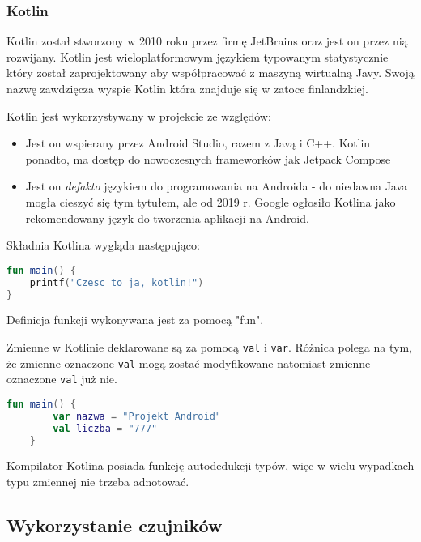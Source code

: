 \subsubsection{Kotlin}

Kotlin został stworzony w 2010 roku przez firmę JetBrains oraz jest on przez nią rozwijany. Kotlin jest wieloplatformowym językiem typowanym statystycznie który został zaprojektowany aby współpracować z maszyną wirtualną Javy. Swoją nazwę zawdzięcza wyspie Kotlin która znajduje się w zatoce finlandzkiej.

Kotlin jest wykorzystywany w projekcie ze względów:

\begin{itemize}
	\item Jest on wspierany przez Android Studio, razem z Javą i C++. Kotlin ponadto, ma dostęp do nowoczesnych frameworków jak Jetpack Compose
	
	\item Jest on \textit{defakto} językiem do programowania na Androida - do niedawna Java mogła cieszyć się tym tytułem, ale od 2019 r. Google ogłosiło Kotlina jako rekomendowany język do tworzenia aplikacji na Android.
\end{itemize}

Składnia Kotlina wygląda następująco:

\begin{lstlisting}[caption=kotlin001 - Funkcje, label={lst:listing-k}, language=kotlin]
fun main() {
	printf("Czesc to ja, kotlin!")
}
\end{lstlisting}
Definicja funkcji wykonywana jest za pomocą "fun".

Zmienne w Kotlinie deklarowane są za pomocą \texttt{val} i \texttt{var}. Różnica polega na tym, że zmienne oznaczone \texttt{val} mogą zostać modyfikowane natomiast zmienne oznaczone \texttt{val} już nie.

\begin{lstlisting}[caption=kotlin002 - Zmienne, label={lst:listing-k}, language=kotlin]
	fun main() {
		var nazwa = "Projekt Android"
		val liczba = "777"
	}
\end{lstlisting}

Kompilator Kotlina posiada funkcję autodedukcji typów, więc w wielu wypadkach typu zmiennej nie trzeba adnotować.

\subsection{Wykorzystanie czujników}

